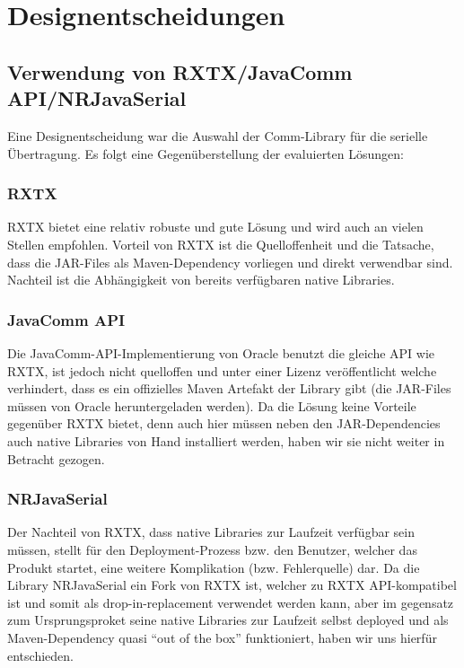 \documentclass[paper=a4, fontsize=11pt]{scrartcl}
\begin{document}
\section{Designentscheidungen}
\subsection{Verwendung von RXTX/JavaComm API/NRJavaSerial}
Eine Designentscheidung war die Auswahl der Comm-Library für die serielle Übertragung. Es folgt eine Gegenüberstellung der evaluierten Lösungen:

\subsubsection{RXTX}
RXTX bietet eine relativ robuste und gute Lösung und wird auch an vielen Stellen empfohlen. Vorteil von RXTX ist die Quelloffenheit und die Tatsache, dass die JAR-Files als Maven-Dependency vorliegen und direkt verwendbar sind. Nachteil ist die Abhängigkeit von bereits verfügbaren native Libraries.

\subsubsection{JavaComm API}
Die JavaComm-API-Implementierung von Oracle benutzt die gleiche API wie RXTX, ist jedoch nicht quelloffen und unter einer Lizenz veröffentlicht welche verhindert, dass es ein offizielles Maven Artefakt der Library gibt (die JAR-Files müssen von Oracle heruntergeladen werden). Da die Lösung keine Vorteile gegenüber RXTX bietet, denn auch hier müssen neben den JAR-Dependencies auch native Libraries von Hand installiert werden, haben wir sie nicht weiter in Betracht gezogen.

\subsubsection{NRJavaSerial}
Der Nachteil von RXTX, dass native Libraries zur Laufzeit verfügbar sein müssen, stellt für den Deployment-Prozess bzw. den Benutzer, welcher das Produkt startet, eine weitere Komplikation (bzw. Fehlerquelle) dar. Da die Library NRJavaSerial ein Fork von RXTX ist, welcher zu RXTX API-kompatibel ist und somit als drop-in-replacement verwendet werden kann, aber im gegensatz zum Ursprungsproket seine native Libraries zur Laufzeit selbst deployed und als Maven-Dependency quasi \enquote{out of the box} funktioniert, haben wir uns hierfür entschieden.
\end{document}
